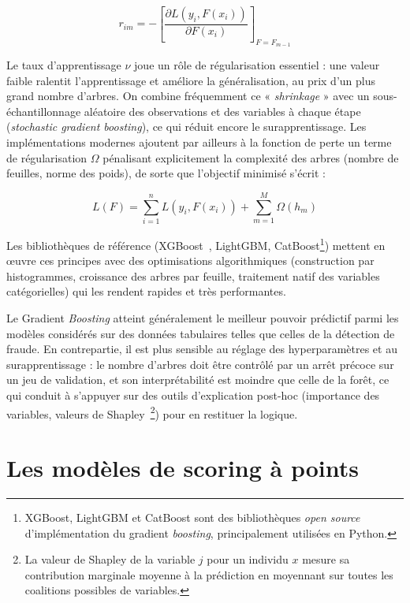 \begin{equation}
    r_{im} = - \left[ \frac{\partial L(y_i, F(x_i))}{\partial F(x_i)} \right]_{F = F_{m-1}}
\end{equation}

Le taux d'apprentissage $\nu$ joue un rôle de régularisation essentiel : une valeur faible ralentit l'apprentissage et améliore la généralisation, au prix d'un plus grand nombre d'arbres. On combine fréquemment ce « \textit{shrinkage} » avec un sous-échantillonnage aléatoire des observations et des variables à chaque étape (\textit{stochastic gradient boosting}), ce qui réduit encore le surapprentissage. Les implémentations modernes ajoutent par ailleurs à la fonction de perte un terme de régularisation $\Omega$ pénalisant explicitement la complexité des arbres (nombre de feuilles, norme des poids), de sorte que l'objectif minimisé s'écrit :

\begin{equation}
    L(F) = \sum_{i=1}^{n} L(y_i, F(x_i)) + \sum_{m=1}^{M} \Omega(h_m)
\end{equation}

Les bibliothèques de référence (XGBoost~\cite{chen_xgboost}, LightGBM, CatBoost\footnote{XGBoost, LightGBM et CatBoost sont des bibliothèques \textit{open source} d'implémentation du gradient \textit{boosting}, principalement utilisées en Python.}) mettent en œuvre ces principes avec des optimisations algorithmiques (construction par histogrammes, croissance des arbres par feuille, traitement natif des variables catégorielles) qui les rendent rapides et très performantes.

Le Gradient \textit{Boosting} atteint généralement le meilleur pouvoir prédictif parmi les modèles considérés sur des données tabulaires telles que celles de la détection de fraude. En contrepartie, il est plus sensible au réglage des hyperparamètres et au surapprentissage : le nombre d'arbres doit être contrôlé par un arrêt précoce sur un jeu de validation, et son interprétabilité est moindre que celle de la forêt, ce qui conduit à s'appuyer sur des outils d'explication post-hoc (importance des variables, valeurs de Shapley~\cite{lundberg_shap}\footnote{La valeur de Shapley de la variable $j$ pour un individu $x$ mesure sa contribution marginale moyenne à la prédiction en moyennant sur toutes les coalitions possibles de variables.}) pour en restituer la logique.


\section{Les modèles de scoring à points}

